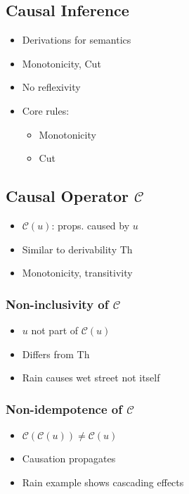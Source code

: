 \documentclass[seminar,palatino,english]{AIGpaper}
\begin{document}
\subsection{Causal Inference}
\begin{itemize}
    \item Derivations for semantics
    \item Monotonicity, Cut
    \item No reflexivity
\end{itemize}
\begin{itemize}
    \item Core rules:
    \begin{itemize}
        \item Monotonicity
        \item Cut
    \end{itemize}
\end{itemize}

\subsection{Causal Operator \texorpdfstring{$\mathcal{C}$}{C}}
\begin{itemize}
    \item \(\mathcal{C}(u)\): props. caused by \(u\)
    \item Similar to derivability Th
    \item Monotonicity, transitivity
\end{itemize}

\subsubsection{Non-inclusivity of \texorpdfstring{$\mathcal{C}$}{C}}
\begin{itemize}
    \item \(u\) not part of \(\mathcal{C}(u)\)
    \item Differs from Th
    \item Rain causes wet street not itself
\end{itemize}

\subsubsection{Non-idempotence of \texorpdfstring{$\mathcal{C}$}{C}}
\begin{itemize}
    \item  \(\mathcal{C}(\mathcal{C}(u)) \neq \mathcal{C}(u)\)
    \item Causation propagates
   \item Rain example shows cascading effects
\end{itemize}
\end{document}
